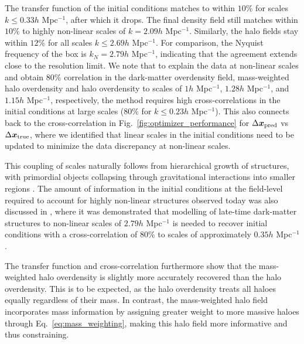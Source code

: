 The transfer function of the initial conditions matches to within $10\%$ for scales $k \leq 0.33h$ Mpc$^{-1}$, after which it drops. The final density field still matches within $10\%$ to highly non-linear scales of $k = 2.09h$ Mpc$^{-1}$. Similarly, the halo fields stay within $12\%$ for all scales $k \leq 2.69h$ Mpc$^{-1}$. For comparison, the Nyquist frequency of the box is $k_N = 2.79h$ Mpc$^{-1}$, indicating that the agreement extends close to the resolution limit. We note that to explain the data at non-linear scales and obtain $80\%$ correlation in the dark-matter overdensity field, mass-weighted halo overdensity and halo overdensity to scales of $1h$ Mpc$^{-1}$, $1.28h$ Mpc$^{-1}$, and $1.15h$ Mpc$^{-1}$, respectively, the method requires high cross-correlations in the initial conditions at large scales ($80\%$ for $k\leq0.23h$ Mpc$^{-1}$). This also connects back to the cross-correlation in Fig.~\ref{fig:optimizer_performance} for $\Delta \boldsymbol{x}_{\mathrm{pred}}$ vs $\Delta \boldsymbol{x}_{\mathrm{true}}$, where we identified that linear scales in the initial conditions need to be updated to minimize the data discrepancy at non-linear scales.

This coupling of scales naturally follows from hierarchical growth of structures, with primordial objects collapsing through gravitational interactions into smaller regions \citep{Gunn1972}. The amount of information in the initial conditions at the field-level required to account for highly non-linear structures observed today was also discussed in \citet{Doeser2024}, where it was demonstrated that modelling of late-time dark-matter structures to non-linear scales of $2.79h$ Mpc$^{-1}$ is needed to recover initial conditions with a cross-correlation of $80\%$ to scales of approximately $0.35h$ Mpc$^{-1}$.

The transfer function and cross-correlation furthermore show that the mass-weighted halo overdensity is slightly more accurately recovered than the halo overdensity. This is to be expected, as the halo overdensity treats all haloes equally regardless of their mass. In contrast, the mass-weighted halo field incorporates mass information by assigning greater weight to more massive haloes through Eq.~\eqref{eq:mass_weighting}, making this halo field more informative and thus constraining. 

